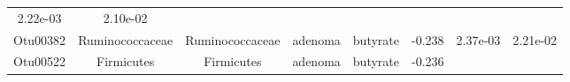 \documentclass[11pt,]{article}
\begin{document}
\begin{longtable}[]{@{}cccccccc@{}}
\begin{minipage}[t]{0.08\columnwidth}
2.22e-03\strut
\end{minipage} & \begin{minipage}[t]{0.08\columnwidth}\centering\strut
2.10e-02\strut
\end{minipage}\tabularnewline
\begin{minipage}[t]{0.08\columnwidth}\centering\strut
Otu00382\strut
\end{minipage} & \begin{minipage}[t]{0.15\columnwidth}\centering\strut
Ruminococcaceae\strut
\end{minipage} & \begin{minipage}[t]{0.15\columnwidth}\centering\strut
Ruminococcaceae\strut
\end{minipage} & \begin{minipage}[t]{0.08\columnwidth}\centering\strut
adenoma\strut
\end{minipage} & \begin{minipage}[t]{0.09\columnwidth}\centering\strut
butyrate\strut
\end{minipage} & \begin{minipage}[t]{0.07\columnwidth}\centering\strut
-0.238\strut
\end{minipage} & \begin{minipage}[t]{0.08\columnwidth}\centering\strut
2.37e-03\strut
\end{minipage} & \begin{minipage}[t]{0.08\columnwidth}\centering\strut
2.21e-02\strut
\end{minipage}\tabularnewline
\begin{minipage}[t]{0.08\columnwidth}\centering\strut
Otu00522\strut
\end{minipage} & \begin{minipage}[t]{0.15\columnwidth}\centering\strut
Firmicutes\strut
\end{minipage} & \begin{minipage}[t]{0.15\columnwidth}\centering\strut
Firmicutes\strut
\end{minipage} & \begin{minipage}[t]{0.08\columnwidth}\centering\strut
adenoma\strut
\end{minipage} & \begin{minipage}[t]{0.09\columnwidth}\centering\strut
butyrate\strut
\end{minipage} & \begin{minipage}[t]{0.07\columnwidth}\centering\strut
-0.236\strut
\end{minipage} & \begin{minipage}[t]{0.08\columnwidth}\centering\strut

\end{minipage}
\end{longtable}
\end{document}
